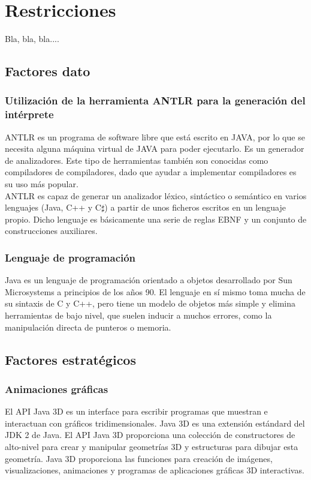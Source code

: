 \chapter{Restricciones}
Bla, bla, bla....

   \section{Factores dato}

      \subsection[Herramienta para el intérprete]{Utilización de la herramienta ANTLR para la generación del intérprete}
      ANTLR es un programa de software libre que está escrito en JAVA, por lo que se necesita alguna máquina virtual de JAVA para poder
      ejecutarlo. Es un generador de analizadores. Este tipo de herramientas también son conocidas como compiladores de compiladores, dado 
      que ayudar a implementar compiladores es su uso más popular.\\

      ANTLR es capaz de generar un analizador léxico, sintáctico o semántico en varios lenguajes (Java, C++ y C$\sharp$) a partir de unos ficheros 
      escritos en un lenguaje propio. Dicho lenguaje es básicamente una serie de reglas EBNF y un conjunto de construcciones auxiliares.\\


      \subsection{Lenguaje de programación}
      Java es un lenguaje de programación orientado a objetos desarrollado por Sun Microsystems a principios de los años 90. El lenguaje en
      sí mismo toma mucha de su sintaxis de C y C++, pero tiene un modelo de objetos más simple y elimina herramientas de bajo nivel, que suelen
      inducir a muchos errores, como la manipulación directa de punteros o memoria.\\


   \section{Factores estratégicos}
      \subsection{Animaciones gráficas}
      El API Java 3D es un interface para escribir programas que muestran e interactuan con gráficos tridimensionales. Java 3D es una extensión
      estándard del JDK 2 de Java. El API Java 3D proporciona una colección de constructores de alto-nivel para crear y manipular geometrías 3D
      y estructuras para dibujar esta geometría. Java 3D proporciona las funciones para creación de imágenes, visualizaciones, animaciones y 
      programas de aplicaciones gráficas 3D interactivas.\\

